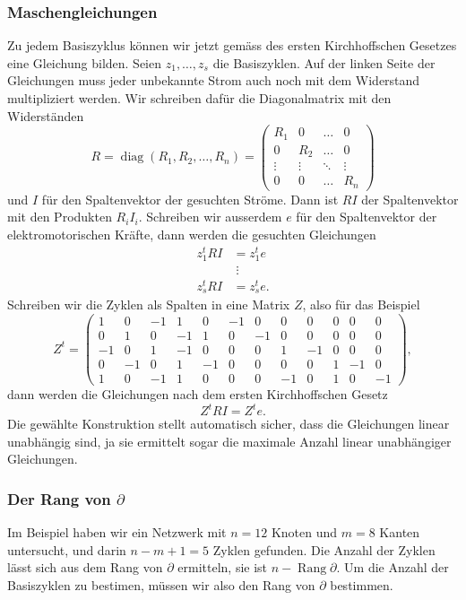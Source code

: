 \subsubsection{Maschengleichungen}
Zu jedem Basiszyklus können wir jetzt gemäss des ersten
Kirchhoffschen Gesetzes eine Gleichung bilden.
Seien $z_1,\dots,z_s$ die Basiszyklen.
Auf der linken Seite der Gleichungen muss jeder unbekannte Strom
auch noch mit dem Widerstand multipliziert werden.
Wir schreiben dafür die Diagonalmatrix
mit den Widerständen
\[
R=
\operatorname{diag}(R_1,R_2,\dots,R_n)=
\begin{pmatrix}
R_1&0&\dots&0\\
0&R_2&\dots&0\\
\vdots&\vdots&\ddots&\vdots\\
0&0&\dots&R_n
\end{pmatrix}
\]
und
$I$ für den Spaltenvektor der gesuchten Ströme. Dann ist $RI$
der Spaltenvektor mit den Produkten $R_iI_i$.
Schreiben wir ausserdem $e$ für den
Spaltenvektor der elektromotorischen Kräfte, dann 
werden die gesuchten Gleichungen
\begin{align*}
z_1^tRI&=z_1^te\\
&\;\vdots\\
z_s^tRI&=z_s^te.
\end{align*}
Schreiben wir die Zyklen als Spalten in eine Matrix $Z$, also für das
Beispiel
\[
Z^t=
\begin{pmatrix}
1&0&-1&1&0&-1&0&0&0&0&0&0\\
0&1&0&-1&1&0&-1&0&0&0&0&0\\
-1&0&1&-1&0&0&0&1&-1&0&0&0\\
0&-1&0&1&-1&0&0&0&0&1&-1&0\\
1&0&-1&1&0&0&0&-1&0&1&0&-1
\end{pmatrix},
\]
dann werden die Gleichungen nach dem ersten Kirchhoffschen Gesetz
\[
Z^tRI=Z^te.
\]
Die gewählte Konstruktion stellt automatisch sicher, dass die
Gleichungen linear unabhängig sind, ja sie ermittelt sogar
die maximale Anzahl linear unabhängiger Gleichungen.

\subsubsection{Der Rang von $\partial$}
Im Beispiel haben wir ein Netzwerk mit $n=12$ Knoten und $m=8$
Kanten untersucht, und darin $n-m+1=5$ Zyklen gefunden. Die Anzahl
der Zyklen lässt sich aus dem Rang von $\partial$ ermitteln,
sie ist $n-\operatorname{Rang}\partial$. Um die Anzahl der
Basiszyklen zu bestimen, müssen wir also den Rang von $\partial$
bestimmen.

